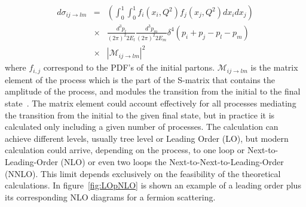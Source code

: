 \begin{eqnarray}
  \label{eq:DiffXS}
  d\sigma_{ij\rightarrow lm} & = & \left( \int_{0}^{1}\int_{0}^{1}f_{i}(x_{i},Q^{2})f_{j}(x_{j},Q^{2})dx_{i}dx_{j} \right) \nonumber \\  
 & \times & \frac{d^{3}p_{l}}{(2\pi)^{2}2E_{l}}\frac{d^{3}p_{m}}{(2\pi)^{2}2E_{m}}\delta^{4}\left( p_{i}+p_{j}-p_{l}-p_{m} \right) \nonumber \\  
 & \times & |\mathcal{M}_{ij\rightarrow lm}|^{2}
\end{eqnarray} where $f_{i,j}$ correspond to the PDF's of the initial partons. $\mathcal{M}_{ij\rightarrow lm}$ is the matrix element of the process which is the part of the S-matrix that contains the amplitude of the process, and modules the transition from the initial to the final state~\cite{opac-b1131978}. The matrix element could account effectively for all processes mediating the transition from the initial to the given final state, but in practice it is calculated only including a given number of processes. The calculation can achieve different levels, usually tree level or Leading Order (LO), but modern calculation could arrive, depending on the process, to one loop or Next-to-Leading-Order (NLO) or even two loops the  Next-to-Next-to-Leading-Order (NNLO). This limit depends exclusively on the feasibility of the theoretical calculations. In figure~\ref{fig:LOpNLO} is shown an example of a leading order plus its corresponding NLO diagrams for a fermion scattering.

